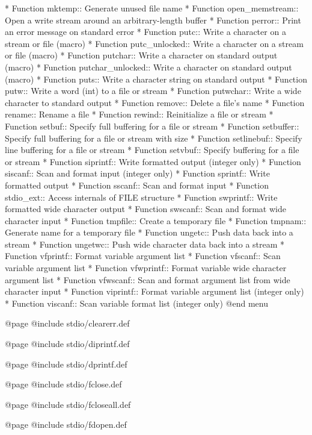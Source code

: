* Function mktemp::      Generate unused file name
* Function open_memstream::	Open a write stream around an arbitrary-length buffer
* Function perror::      Print an error message on standard error
* Function putc::        Write a character on a stream or file (macro)
* Function putc_unlocked::	Write a character on a stream or file (macro)
* Function putchar::     Write a character on standard output (macro)
* Function putchar_unlocked::	Write a character on standard output (macro)
* Function puts::        Write a character string on standard output
* Function putw::        Write a word (int) to a file or stream
* Function putwchar::    Write a wide character to standard output
* Function remove::      Delete a file's name
* Function rename::      Rename a file
* Function rewind::      Reinitialize a file or stream
* Function setbuf::      Specify full buffering for a file or stream
* Function setbuffer::   Specify full buffering for a file or stream with size
* Function setlinebuf::  Specify line buffering for a file or stream
* Function setvbuf::     Specify buffering for a file or stream
* Function siprintf::    Write formatted output (integer only)
* Function siscanf::     Scan and format input (integer only)
* Function sprintf::     Write formatted output
* Function sscanf::      Scan and format input
* Function stdio_ext::   Access internals of FILE structure
* Function swprintf::    Write formatted wide character output
* Function swscanf::     Scan and format wide character input
* Function tmpfile::     Create a temporary file
* Function tmpnam::      Generate name for a temporary file
* Function ungetc::      Push data back into a stream
* Function ungetwc::     Push wide character data back into a stream
* Function vfprintf::    Format variable argument list
* Function vfscanf::     Scan variable argument list
* Function vfwprintf::   Format variable wide character argument list
* Function vfwscanf::    Scan and format argument list from wide character input
* Function viprintf::    Format variable argument list (integer only)
* Function viscanf::     Scan variable format list (integer only)
@end menu

@page
@include stdio/clearerr.def

@page
@include stdio/diprintf.def

@page
@include stdio/dprintf.def

@page
@include stdio/fclose.def

@page
@include stdio/fcloseall.def

@page
@include stdio/fdopen.def

